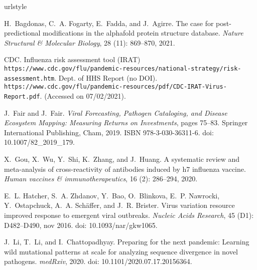 \documentclass[onecolumn, compsoc,12pt]{IEEEtran}
\begin{document}
 \begin{thebibliography}{11}
\providecommand{\natexlab}[1]{#1}
\providecommand{\url}[1]{\texttt{#1}}
\expandafter\ifx\csname urlstyle\endcsname\relax
  \providecommand{\doi}[1]{doi: #1}\else
  \providecommand{\doi}{doi: \begingroup \urlstyle{rm}\Url}\fi

H.~Bagdonas, C.~A. Fogarty, E.~Fadda, and J.~Agirre.
\newblock The case for post-predictional modifications in the alphafold protein
  structure database.
\newblock \emph{Nature Structural \& Molecular Biology}, 28
  (11): 869--870, 2021.

CDC.
\newblock Influenza risk assessment tool (IRAT)
\newblock
\url{https://www.cdc.gov/flu/pandemic-resources/national-strategy/risk-assessment.htm}.
\newblock Dept. of HHS Report (no DOI).
\newblock
  \url{https://www.cdc.gov/flu/pandemic-resources/pdf/CDC-IRAT-Virus-Report.pdf}.
\newblock (Accessed on 07/02/2021).


J.~Fair and J.~Fair.
\newblock \emph{Viral Forecasting, Pathogen Cataloging, and Disease Ecosystem
  Mapping: Measuring Returns on Investments}, pages 75--83.
\newblock Springer International Publishing, Cham, 2019.
\newblock ISBN 978-3-030-36311-6.
\newblock \doi{10.1007/82_2019_179}.

X.~Gou, X.~Wu, Y.~Shi, K.~Zhang, and J.~Huang.
\newblock A systematic review and meta-analysis of cross-reactivity of
  antibodies induced by h7 influenza vaccine.
\newblock \emph{Human vaccines \& immunotherapeutics}, 16
  (2): 286--294, 2020.

E.~L. Hatcher, S.~A. Zhdanov, Y.~Bao, O.~Blinkova, E.~P. Nawrocki,
  Y.~Ostapchuck, A.~A. Schäffer, and J.~R. Brister.
\newblock Virus variation resource {\textendash} improved response to emergent
  viral outbreaks.
\newblock \emph{Nucleic Acids Research}, 45 (D1): D482--D490,
  nov 2016.
\newblock \doi{10.1093/nar/gkw1065}.

J.~Li, T.~Li, and I.~Chattopadhyay.
\newblock Preparing for the next pandemic: Learning wild mutational patterns at
  scale for analyzing sequence divergence in novel pathogens.
\newblock \emph{medRxiv}, 2020.
\newblock \doi{10.1101/2020.07.17.20156364}.


\end{thebibliography}
\end{document}
